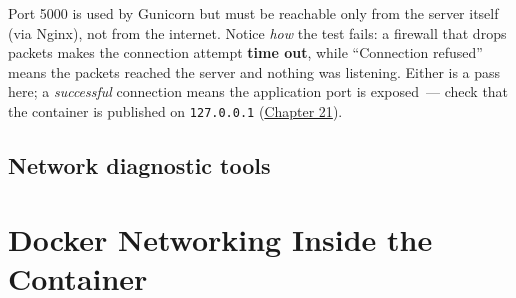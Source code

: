 \noindent{}Port 5000 is used by Gunicorn but must be reachable only from the server itself (via Nginx), not from the internet. Notice \emph{how} the test fails: a firewall that drops packets makes the connection attempt \textbf{time out}, while ``Connection refused'' means the packets reached the server and nothing was listening. Either is a pass here; a \emph{successful} connection means the application port is exposed~--- check that the container is published on \texttt{127.0.0.1} (\hyperref[ch:21-system-setup]{Chapter 21}).

\subsection*{Network diagnostic tools}\label{22-network-configuration:network-diagnostic-tools}

\begin{codebox}[short]

\begin{Shaded}
\begin{Highlighting}[]


\end{Highlighting}
\end{Shaded}

\end{codebox}

\setcounter{section}{5}
\section{Docker Networking Inside the Container}\label{22-network-configuration:226-docker-networking-inside-the-container}

